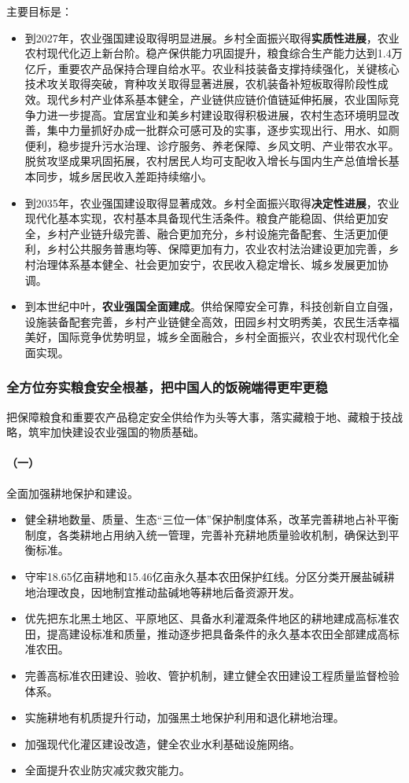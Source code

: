 主要目标是：

\begin{itemize}
    \item 到2027年，农业强国建设取得明显进展。乡村全面振兴取得\textbf{实质性进展}，农业农村现代化迈上新台阶。稳产保供能力巩固提升，粮食综合生产能力达到1.4万亿斤，重要农产品保持合理自给水平。农业科技装备支撑持续强化，关键核心技术攻关取得突破，育种攻关取得显著进展，农机装备补短板取得阶段性成效。现代乡村产业体系基本健全，产业链供应链价值链延伸拓展，农业国际竞争力进一步提高。宜居宜业和美乡村建设取得积极进展，农村生态环境明显改善，集中力量抓好办成一批群众可感可及的实事，逐步实现出行、用水、如厕便利，稳步提升污水治理、诊疗服务、养老保障、乡风文明、产业带农水平。脱贫攻坚成果巩固拓展，农村居民人均可支配收入增长与国内生产总值增长基本同步，城乡居民收入差距持续缩小。
    \item 到2035年，农业强国建设取得显著成效。乡村全面振兴取得\textbf{决定性进展}，农业现代化基本实现，农村基本具备现代生活条件。粮食产能稳固、供给更加安全，乡村产业链升级完善、融合更加充分，乡村设施完备配套、生活更加便利，乡村公共服务普惠均等、保障更加有力，农业农村法治建设更加完善，乡村治理体系基本健全、社会更加安宁，农民收入稳定增长、城乡发展更加协调。
    \item 到本世纪中叶，\textbf{农业强国全面建成}。供给保障安全可靠，科技创新自立自强，设施装备配套完善，乡村产业链健全高效，田园乡村文明秀美，农民生活幸福美好，国际竞争优势明显，城乡全面融合，乡村全面振兴，农业农村现代化全面实现。
\end{itemize}

\subsubsection{全方位夯实粮食安全根基，把中国人的饭碗端得更牢更稳}

把保障粮食和重要农产品稳定安全供给作为头等大事，落实藏粮于地、藏粮于技战略，筑牢加快建设农业强国的物质基础。

\paragraph{（一）}全面加强耕地保护和建设。

\begin{itemize}
    \item 健全耕地数量、质量、生态“三位一体”保护制度体系，改革完善耕地占补平衡制度，各类耕地占用纳入统一管理，完善补充耕地质量验收机制，确保达到平衡标准。
    \item 守牢18.65亿亩耕地和15.46亿亩永久基本农田保护红线。分区分类开展盐碱耕地治理改良，因地制宜推动盐碱地等耕地后备资源开发。
    \item 优先把东北黑土地区、平原地区、具备水利灌溉条件地区的耕地建成高标准农田，提高建设标准和质量，推动逐步把具备条件的永久基本农田全部建成高标准农田。
    \item 完善高标准农田建设、验收、管护机制，建立健全农田建设工程质量监督检验体系。
    \item 实施耕地有机质提升行动，加强黑土地保护利用和退化耕地治理。
    \item 加强现代化灌区建设改造，健全农业水利基础设施网络。
    \item 全面提升农业防灾减灾救灾能力。
\end{itemize}

